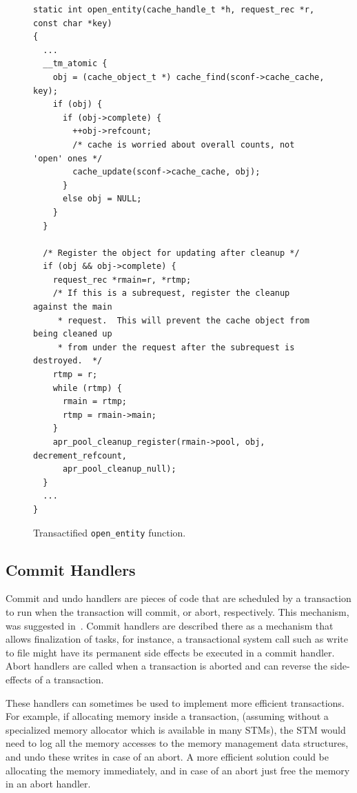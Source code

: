 \documentclass[11pt]{sigplanconf}
\let \cite = \citep
\begin{document}
\begin{figure}
\begin{lstlisting}
static int open_entity(cache_handle_t *h, request_rec *r, const char *key)
{
  ...
  __tm_atomic {
    obj = (cache_object_t *) cache_find(sconf->cache_cache, key);
    if (obj) {
      if (obj->complete) {
        ++obj->refcount;
        /* cache is worried about overall counts, not 'open' ones */
        cache_update(sconf->cache_cache, obj);
      }
      else obj = NULL;
    }
  }

  /* Register the object for updating after cleanup */
  if (obj && obj->complete) {
    request_rec *rmain=r, *rtmp;
    /* If this is a subrequest, register the cleanup against the main
     * request.  This will prevent the cache object from being cleaned up
     * from under the request after the subrequest is destroyed.  */
    rtmp = r;
    while (rtmp) {
      rmain = rtmp;
      rtmp = rmain->main;
    }
    apr_pool_cleanup_register(rmain->pool, obj, decrement_refcount, 
      apr_pool_cleanup_null);
  }
  ...
}
\end{lstlisting}
\caption{Transactified {\tt open\_entity} function.}
\label{code:transactified-open-entity}
\end{figure}

\subsection{Commit Handlers}
Commit and undo handlers are pieces of code that are scheduled by a transaction
to run when the transaction will commit, or abort, respectively. This mechanism,
was suggested in~\cite{tm:commit-handlers}.  Commit handlers are described
there as a mechanism that allows finalization of tasks, for instance, a
transactional system call such as write to file might have its permanent side
effects be executed in a commit handler. 
Abort handlers are called when a transaction is aborted and can reverse the 
side-effects of a transaction. 

These handlers can sometimes be used to implement
more efficient transactions. For example, if allocating memory inside a
transaction, (assuming without a specialized memory allocator which is available
in many STMs), the STM would need to log all the memory accesses to the memory
management data structures, and undo these writes in case of an abort. A more
efficient solution could be allocating the memory immediately, and in case of an
abort just free the memory in an abort handler.
\end{document}
